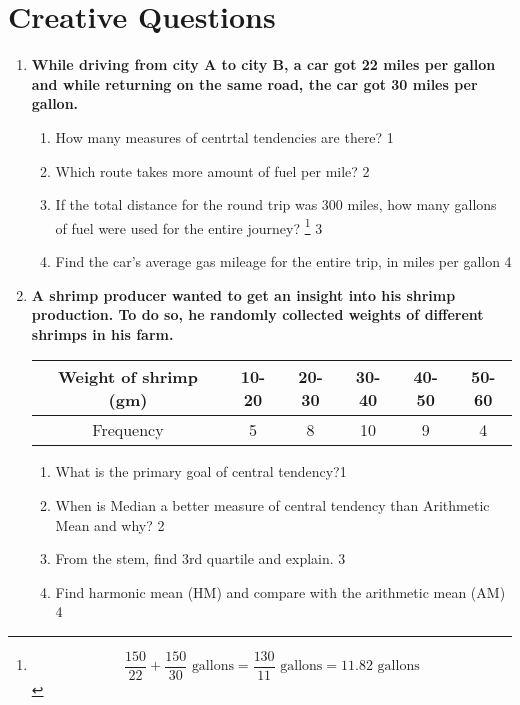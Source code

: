 \documentclass[a4paper,oneside]{book}
\begin{document}
\section{Creative Questions}
\begin{enumerate}

 \item
	  \textbf{While driving from city A to city B, a car got 22 miles per gallon and
while returning on the same road, the car got 30 miles per gallon.} 
  
  \begin{enumerate}
    \item
	How many measures of centrtal tendencies are there? \hfill 1
    \item
	Which route takes more amount of fuel per mile? \hfill 2
    \item  
	If the total distance for the round trip was 300 miles, how many gallons of fuel were used for the entire journey? \footnote{$$\frac{150}{22} + \frac{150}{30} \text{ gallons} = \frac{130}{11} \text{ gallons} = 11.82 \text{ gallons}$$} \hfill 3
    \item
	Find the car’s average gas mileage for the entire trip, in miles per gallon \hfill 4
  \end{enumerate}

     \item
	  \textbf{A shrimp producer wanted to get an insight into his shrimp production. To do so, he randomly collected weights of different shrimps in his farm.} 
	  

	  \begin{table}[h]
	  \centering
\begin{tabular}{c|c|c|c|c|c}
Weight of shrimp (gm) & 10-20 & 20-30 & 30-40 & 40-50 & 50-60 \\ \hline
Frequency & 5 & 8 & 10 & 9 & 4
\end{tabular}
\end{table}

  \begin{enumerate}
    \item
	What is the primary goal of central tendency?\hfill 1
    \item
	When is Median a better measure of central tendency than Arithmetic Mean and why? \hfill 2
    \item  
	From the stem, find 3rd quartile and explain. \hfill 3
    \item
	Find harmonic mean (HM) and compare with the arithmetic mean (AM) \hfill 4
  \end{enumerate}


\end{enumerate}
\end{document}

